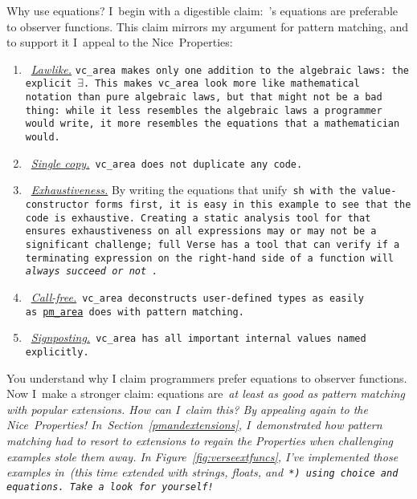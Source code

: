 \documentclass[manuscript,screen 12pt, nonacm]{acmart}
\begin{document}
    Why use equations? I~begin with a digestible claim:~\VC's equations are
    preferable to observer functions. This claim mirrors my argument for pattern
    matching, and to support it I~appeal to the Nice~Properties: 

    \begin{enumerate}
      \item~\hyperref[p1]{\it{Lawlike.}} 
      \tt{vc\_area} makes only one addition to the algebraic laws: the explicit
      $\exists$. This makes~\tt{vc\_area} look more like mathematical notation
      than pure algebraic laws, but that might not be a bad thing: while it less
      resembles the algebraic laws a programmer would write, it more resembles
      the equations that a mathematician would. 
      \item~\hyperref[p2]{\it{Single copy.}}~\tt{vc\_area} does not duplicate any code. 
      \item~\hyperref[p5]{\it{Exhaustiveness.}}  By writing the equations that
      unify~\tt{sh} with the value-constructor forms first, it is easy in this
      example to see that the code is exhaustive. Creating a static analysis
      tool for~\VC that ensures exhaustiveness on all expressions may or may not
      be a significant challenge; full Verse has a tool that can verify if a
      terminating expression on the right-hand side of a function will
      \it{always succeed} or not~\citep{peyton-jones2024verification}.
      \item~\hyperref[p3]{\it{Call-free.}}~\tt{vc\_area} deconstructs
      user-defined types as easily as~\hyperref[fig:pmarea]{\tt{pm\_area}} does
      with pattern matching. 
      \item~\hyperref[p4]{\it{Signposting.}}~\tt{vc\_area} has all important
      internal values named explicitly.
      
    \end{enumerate}

    You understand why I claim programmers prefer equations to observer
    functions. Now I~make a stronger claim: equations are~\it{at least as good
    as} pattern matching with popular extensions. How can I~claim this? By
    appealing again to the Nice~Properties! In~Section~\ref{pmandextensions},
    I~demonstrated how pattern matching had to resort to extensions to regain
    the Properties when challenging examples stole them away. In
    Figure~\ref{fig:verseextfuncs}, I've implemented those examples in~\VC (this
    time extended with strings, floats, and~\tt{*}) using choice and equations.
    Take a look for yourself! 
\end{document}
